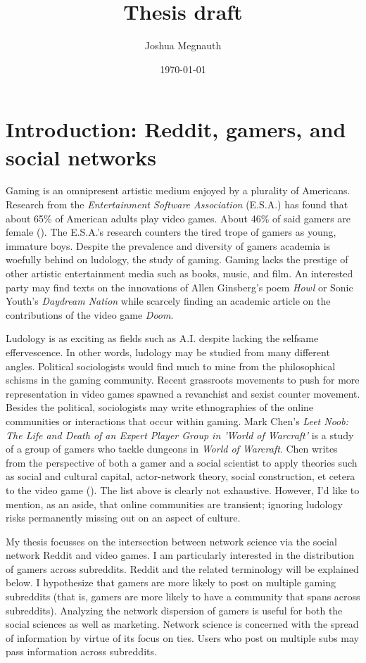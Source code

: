 \documentclass[12pt, a4paper]{article}
\title{Thesis draft}
\author{Joshua Megnauth}
\date{\today}
\begin{document}
\maketitle

\section{Introduction: Reddit, gamers, and social networks}
Gaming is an omnipresent artistic medium enjoyed by a plurality of Americans. Research from the \textit{Entertainment Software Association} (E.S.A.) has found that about 65\% of American adults play video games. About 46\% of said gamers are female (\cite{esagamers}). The E.S.A.'s research counters the tired trope of gamers as young, immature boys. Despite the prevalence and diversity of gamers academia is woefully behind on ludology, the study of gaming. Gaming lacks the prestige of other artistic entertainment media such as books, music, and film. An interested party may find texts on the innovations of Allen Ginsberg's poem \textit{Howl} or Sonic Youth's \textit{Daydream Nation} while scarcely finding an academic article on the contributions of the video game \textit{Doom}. 

Ludology is as exciting as fields such as A.I. despite lacking the selfsame effervescence. In other words, ludology may be studied from many different angles. Political sociologists would find much to mine from the philosophical schisms in the gaming community. Recent grassroots movements to push for more representation in video games spawned a revanchist and sexist counter movement. Besides the political, sociologists may write ethnographies of the online communities or interactions that occur within gaming. Mark Chen's \textit{Leet Noob: The Life and Death of an Expert Player Group in 'World of Warcraft'} is a study of a group of gamers who tackle dungeons in \textit{World of Warcraft}. Chen writes from the perspective of both a gamer and a social scientist to apply theories such as social and cultural capital, actor-network theory, social construction, et cetera to the video game (\cite{chenwow}). The list above is clearly not exhaustive. However, I'd like to mention, as an aside, that online communities are transient; ignoring ludology risks permanently missing out on an aspect of culture.

My thesis focusses on the intersection between network science via the social network Reddit and video games. I am particularly interested in the distribution of gamers across subreddits. Reddit and the related terminology will be explained below. I hypothesize that gamers are more likely to post on multiple gaming subreddits (that is, gamers are more likely to have a community that spans across subreddits). Analyzing the network dispersion of gamers is useful for both the social sciences as well as marketing. Network science is concerned with the spread of information by virtue of its focus on ties. Users who post on multiple subs may pass information across subreddits.
\end{document}
